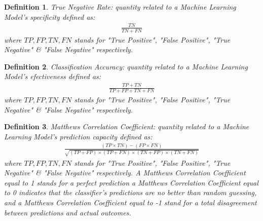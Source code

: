 \documentclass[12pt,letterpaper]{article}
\newtheorem{definition}{Definition}
\begin{document}
\begin{multicols}{2}
\begin{definition}\label{definitionTrueNegativeRate}
True Negative Rate: quantity related to a Machine Learning Model's specificity defined as:
\begin{align}
\frac{TN}{TN+FN}
\end{align}
where $TP,FP,TN,FN$ stands for "True Positive", "False Positive", "True Negative" \& "False Negative" respectively.
\end{definition}

\begin{definition}\label{definitionClassificationAccuracy}
Classification Accuracy: quantity related to a Machine Learning Model's efectiveness defined as:
\begin{align}
\frac{TP+TN}{TP+FP+TN+FN}
\end{align}
where $TP,FP,TN,FN$ stands for "True Positive", "False Positive", "True Negative" \& "False Negative" respectively.
\end{definition}

\begin{definition}\label{definitionMatthewsCorrelationCoeficient}
Matthews Correlation Coefficient: quantity related to a Machine Learning Model's prediction capacity defined as:
{\scriptsize
\begin{align}
\frac{(TP\times TN)-(FP\times FN)}{\sqrt{(TP+FP)\times(TP+FN)\times(TN+FP)\times(TN+FN)}}
\end{align}
}where $TP,FP,TN,FN$ stands for "True Positive", "False Positive", "True Negative" \& "False Negative" respectively.
A Matthews Correlation Coefficient equal to 1 stands for a perfect prediction a Matthews Correlation Coefficient equal to 0 indicates that the classifier’s predictions are no better than random guessing, and a Matthews Correlation Coefficient equal to -1 stand for a total disagreement between predictions and actual outcomes.
\end{definition}
\end{multicols}
\end{document}
